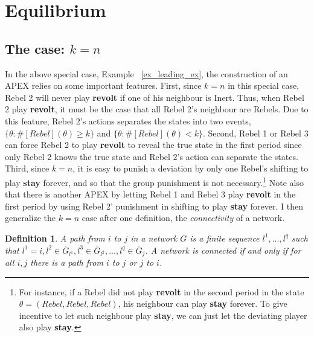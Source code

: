 \documentclass[12pt,letter]{article}
\newtheorem{definition}{Definition}[section]
\theoremstyle{definition}
\theoremstyle{remark}
\theoremstyle{claim}
\begin{document}
\section{Equilibrium}
\label{sec:equilibrium}
\subsection{The case: $k=n$}

In the above special case, Example ~\ref{ex_leading_ex}, the construction of an APEX relies on some important features. First, since $k=n$ in this special case, Rebel 2 will never play \textbf{revolt} if one of his neighbour is Inert. Thus, when Rebel 2 play \textbf{revolt}, it must be the case that all Rebel 2's neighbour are Rebels. Due to this feature, Rebel 2's actions separates the states into two events, $\{\theta: \#[Rebel](\theta)\geq k\}$ and $\{\theta: \#[Rebel](\theta)< k\}$. Second, Rebel 1 or Rebel 3 can force Rebel 2 to play \textbf{revolt} to reveal the true state in the first period since only Rebel 2 knows the true state and Rebel 2's action can separate the states. Third, since $k=n$, it is easy to punish a deviation by only one Rebel's shifting to play \textbf{stay} forever, and so that the group punishment is not necessary.\footnote{For instance, if a Rebel did not play \textbf{revolt} in the second period in the state $\theta=(Rebel,Rebel,Rebel)$, his neighbour can play \textbf{stay} forever. To give incentive to let such neighbour play \textbf{stay}, we can just let the deviating player also play \textbf{stay}.} Note also that there is another APEX by letting Rebel 1 and Rebel 3 play \textbf{revolt} in the first period by using Rebel 2' punishment in shifting to play \textbf{stay} forever. I then generalize the $k=n$ case after one definition, the \textit{connectivity} of a network.

\begin{definition}
A path from $i$ to $j$ in a network $G$ is a finite sequence $l^1,...,l^q$ such that $l^1=i, l^2\in \bar{G}_{l^1}, l^3\in \bar{G}_{l^2},...,l^q\in \bar{G}_j$. A network is connected if and only if for all $i,j$ there is a path from $i$ to $j$ or $j$ to $i$. 
\end{definition}
\end{document}
